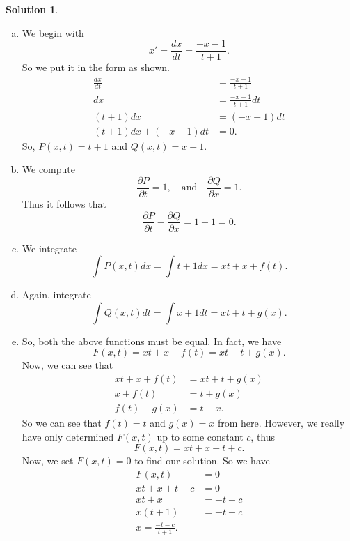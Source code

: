 \documentclass[12pt]{report} %
\theoremstyle{definition}
\newtheorem{solution}{Solution}
\begin{document}
\begin{solution}~
\begin{enumerate}[(a)]
    \item We begin with 
    \[
    x' = \frac{dx}{dt}=\frac{-x-1}{t+1}.
    \]
    So we put it in the form as shown.
    \begin{align*}
        \frac{dx}{dt}&=\frac{-x-1}{t+1}\\
        dx &= \frac{-x-1}{t+1}dt\\
        (t+1)dx &= (-x-1)dt\\
        (t+1)dx+(-x-1)dt &=0.
    \end{align*}
    So, $P(x,t)=t+1$ and $Q(x,t)=x+1$.  
    \item We compute
    \[
    \frac{\partial P}{\partial t} = 1, \quad \textrm{and} \quad \frac{\partial Q}{\partial x} = 1.
    \]
    Thus it follows that
    \[
    \frac{\partial P}{\partial t}-\frac{\partial Q}{\partial x}=1-1=0.
    \]
    \item We integrate 
    \[
    \int P(x,t)dx = \int t+1 dx = xt+x + f(t).
    \]
    \item Again, integrate
    \[
    \int Q(x,t)dt = \int x+1 dt = xt + t + g(x).
    \]
    \item So, both the above functions must be equal. In fact, we have
    \[
    F(x,t) = xt+x+f(t)= xt+t+g(x).
    \]
    Now, we can see that
    \begin{align*}
        xt+x+f(t)&=xt+t+g(x)\\
        x+f(t)&=t+g(x)\\
        f(t)-g(x)&= t-x.
    \end{align*}
    So we can see that $f(t)=t$ and $g(x)=x$ from here.  However, we really have only determined $F(x,t)$ up to some constant $c$, thus
    \[
    F(x,t) = xt+x+t+c.
    \]
    Now, we set $F(x,t)=0$ to find our solution. So we have
    \begin{align*}
        F(x,t) &= 0\\
        xt+x+t+c&=0\\
        xt+x&=-t-c\\
        x(t+1)&=-t-c\\
        x=\frac{-t-c}{t+1}.
    \end{align*}
\end{enumerate}

\end{solution}
\end{document}
